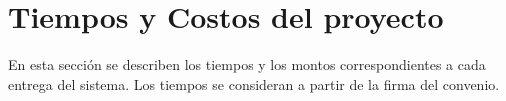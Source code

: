 \documentclass[10pt]{book}
\begin{document}
\section{Tiempos y Costos del proyecto}

	En esta sección se describen los tiempos y los montos correspondientes a cada entrega del sistema. Los  tiempos se consideran a partir de la firma del convenio.\\


\clossing
\end{document}
